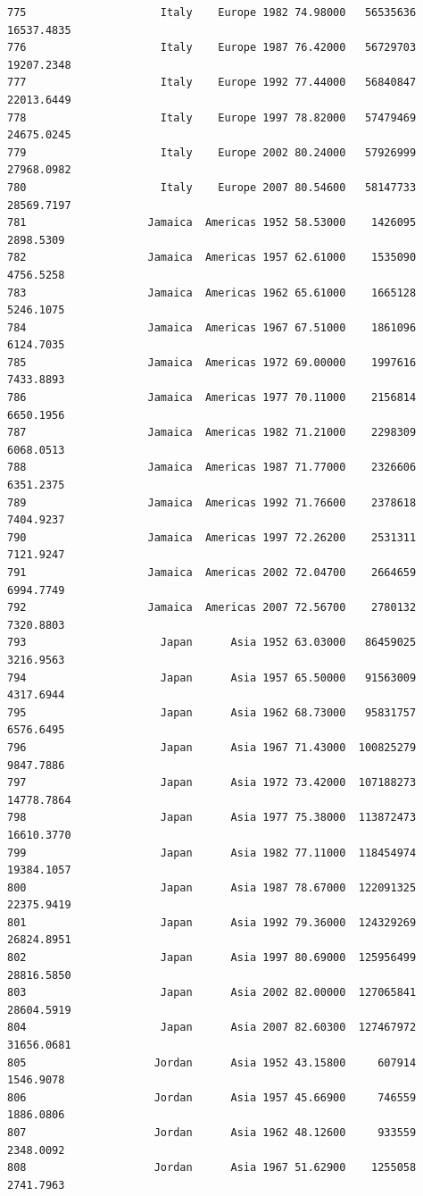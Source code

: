 \documentclass[
  letterpaper,
  DIV=11,
  numbers=noendperiod]{scrreprt}
\begin{document}
\begin{verbatim}
775                     Italy    Europe 1982 74.98000   56535636  16537.4835
776                     Italy    Europe 1987 76.42000   56729703  19207.2348
777                     Italy    Europe 1992 77.44000   56840847  22013.6449
778                     Italy    Europe 1997 78.82000   57479469  24675.0245
779                     Italy    Europe 2002 80.24000   57926999  27968.0982
780                     Italy    Europe 2007 80.54600   58147733  28569.7197
781                   Jamaica  Americas 1952 58.53000    1426095   2898.5309
782                   Jamaica  Americas 1957 62.61000    1535090   4756.5258
783                   Jamaica  Americas 1962 65.61000    1665128   5246.1075
784                   Jamaica  Americas 1967 67.51000    1861096   6124.7035
785                   Jamaica  Americas 1972 69.00000    1997616   7433.8893
786                   Jamaica  Americas 1977 70.11000    2156814   6650.1956
787                   Jamaica  Americas 1982 71.21000    2298309   6068.0513
788                   Jamaica  Americas 1987 71.77000    2326606   6351.2375
789                   Jamaica  Americas 1992 71.76600    2378618   7404.9237
790                   Jamaica  Americas 1997 72.26200    2531311   7121.9247
791                   Jamaica  Americas 2002 72.04700    2664659   6994.7749
792                   Jamaica  Americas 2007 72.56700    2780132   7320.8803
793                     Japan      Asia 1952 63.03000   86459025   3216.9563
794                     Japan      Asia 1957 65.50000   91563009   4317.6944
795                     Japan      Asia 1962 68.73000   95831757   6576.6495
796                     Japan      Asia 1967 71.43000  100825279   9847.7886
797                     Japan      Asia 1972 73.42000  107188273  14778.7864
798                     Japan      Asia 1977 75.38000  113872473  16610.3770
799                     Japan      Asia 1982 77.11000  118454974  19384.1057
800                     Japan      Asia 1987 78.67000  122091325  22375.9419
801                     Japan      Asia 1992 79.36000  124329269  26824.8951
802                     Japan      Asia 1997 80.69000  125956499  28816.5850
803                     Japan      Asia 2002 82.00000  127065841  28604.5919
804                     Japan      Asia 2007 82.60300  127467972  31656.0681
805                    Jordan      Asia 1952 43.15800     607914   1546.9078
806                    Jordan      Asia 1957 45.66900     746559   1886.0806
807                    Jordan      Asia 1962 48.12600     933559   2348.0092
808                    Jordan      Asia 1967 51.62900    1255058   2741.7963

\end{verbatim}
\end{document}
